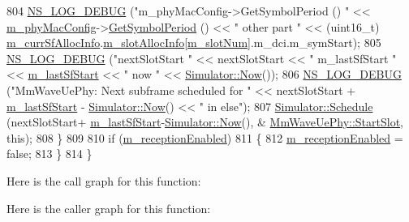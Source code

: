 \begin{DoxyCode}
804                 \hyperlink{group__logging_ga413f1886406d49f59a6a0a89b77b4d0a}{NS\_LOG\_DEBUG} (\textcolor{stringliteral}{"m\_phyMacConfig->GetSymbolPeriod () "} << 
      \hyperlink{classns3_1_1MmWavePhy_a869abf36bbdbb94eed77ba6e4846f6e4}{m\_phyMacConfig}->\hyperlink{classns3_1_1MmWavePhyMacCommon_a1048fa4a24a72abc5d4d982efd6c21af}{GetSymbolPeriod} () << \textcolor{stringliteral}{" other part "} << (uint16\_t) 
      \hyperlink{classns3_1_1MmWaveUePhy_ac557b99a2b425df99cb8d827f939df90}{m\_currSfAllocInfo}.\hyperlink{structns3_1_1SfAllocInfo_a6a87109ff89bf270a74ff95a5bbf9231}{m\_slotAllocInfo}[\hyperlink{classns3_1_1MmWavePhy_a6c83cdb8c36a9a58ae8b9f17933680ac}{m\_slotNum}].m\_dci.m\_symStart);
805                 \hyperlink{group__logging_ga413f1886406d49f59a6a0a89b77b4d0a}{NS\_LOG\_DEBUG} (\textcolor{stringliteral}{"nextSlotStart "} << nextSlotStart << \textcolor{stringliteral}{" m\_lastSfStart "} << 
      \hyperlink{classns3_1_1MmWaveUePhy_a162b30346c93b63bb74d9ab142c1a0d5}{m\_lastSfStart} << \textcolor{stringliteral}{" now "} << \hyperlink{classns3_1_1Simulator_ac3178fa975b419f7875e7105be122800}{Simulator::Now}());
806                 \hyperlink{group__logging_ga413f1886406d49f59a6a0a89b77b4d0a}{NS\_LOG\_DEBUG} (\textcolor{stringliteral}{"MmWaveUePhy: Next subframe scheduled for "} << nextSlotStart + 
      \hyperlink{classns3_1_1MmWaveUePhy_a162b30346c93b63bb74d9ab142c1a0d5}{m\_lastSfStart} - \hyperlink{classns3_1_1Simulator_ac3178fa975b419f7875e7105be122800}{Simulator::Now}() << \textcolor{stringliteral}{" in else"});
807                 \hyperlink{classns3_1_1Simulator_a671882c894a08af4a5e91181bf1eec13}{Simulator::Schedule} (nextSlotStart+
      \hyperlink{classns3_1_1MmWaveUePhy_a162b30346c93b63bb74d9ab142c1a0d5}{m\_lastSfStart}-\hyperlink{classns3_1_1Simulator_ac3178fa975b419f7875e7105be122800}{Simulator::Now}(), &
      \hyperlink{classns3_1_1MmWaveUePhy_a0ba9495d0cc715ff879dead5c1b5ac5e}{MmWaveUePhy::StartSlot}, \textcolor{keyword}{this});
808         \}
809 
810         \textcolor{keywordflow}{if} (\hyperlink{classns3_1_1MmWaveUePhy_a3ce209682bac7903e014ea63df3cf0f5}{m\_receptionEnabled})
811         \{
812                 \hyperlink{classns3_1_1MmWaveUePhy_a3ce209682bac7903e014ea63df3cf0f5}{m\_receptionEnabled} = \textcolor{keyword}{false};
813         \}
814 \}
\end{DoxyCode}


Here is the call graph for this function\+:




Here is the caller graph for this function\+:



